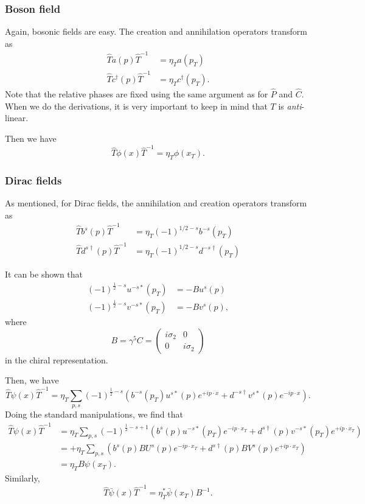 \documentclass[a4paper]{article}
\begin{document}
\subsubsection*{Boson field}
Again, bosonic fields are easy. The creation and annihilation operators transform as
\begin{align*}
  \hat{T} a(p) \hat{T}^{-1} &= \eta_T a(p_T)\\
  \hat{T} c^\dagger(p) \hat{T}^{-1} &= \eta_T c^\dagger(p_T).
\end{align*}
Note that the relative phases are fixed using the same argument as for $\hat{P}$ and $\hat{C}$. When we do the derivations, it is very important to keep in mind that $T$ is \emph{anti}-linear.

Then we have
\[
  \hat{T}\phi(x) \hat{T}^{-1} = \eta_T \phi(x_T).
\]
\subsubsection*{Dirac fields}
As mentioned, for Dirac fields, the annihilation and creation operators transform as
\begin{align*}
  \hat{T} b^s(p) \hat{T}^{-1} &= \eta_T (-1)^{1/2 - s} b^{-s}(p_T)\\
  \hat{T} d^{s\dagger}(p) \hat{T}^{-1} &= \eta_T (-1)^{1/2 - s} d^{-s\dagger}(p_T)
\end{align*}

It can be shown that
\begin{align*}
  (-1)^{\frac{1}{2} - s} u^{-s*}(p_T) &= -B u^s(p)\\
  (-1)^{\frac{1}{2} - s} v^{-s*}(p_T) &= -B v^s(p),
\end{align*}
where
\[
  B = \gamma^5 C =
  \begin{pmatrix}
    i\sigma_2 & 0\\
    0 & i \sigma_2
  \end{pmatrix}
\]
in the chiral representation.

Then, we have
\[
  \hat{T} \psi(x) \hat{T}^{-1} = \eta_T \sum_{p, s} (-1)^{\frac{1}{2} - s} \left(b^{-s}(p_T) u^{s*}(p) e^{+ip\cdot x} + d^{-s\dagger} v^{s*}(p) e^{-ip\cdot x}\right).
\]
Doing the standard manipulations, we find that
\begin{align*}
  \hat{T} \psi(x) \hat{T}^{-1} &= \eta_T \sum_{p, s} (-1)^{\frac{1}{2} - s + 1} \left(b^s(p) u^{-s*}(p_T) e^{-ip\cdot x_T} + d^{s\dagger}(p) v^{-s*}(p_T) e^{+ip\cdot x_T}\right)\\
  &= +\eta_T \sum_{p, s} \left(b^s(p) BU^s(p) e^{-ip\cdot x_T} + d^{s\dagger} (p) BV^s(p) e^{+ip\cdot x_T}\right)\\
  &= \eta_T B \psi(x_T).
\end{align*}
Similarly,
\[
  \hat{T}\bar\psi(x) \hat{T}^{-1} = \eta_T^* \bar\psi(x_T) B^{-1}.
\]
\end{document}
